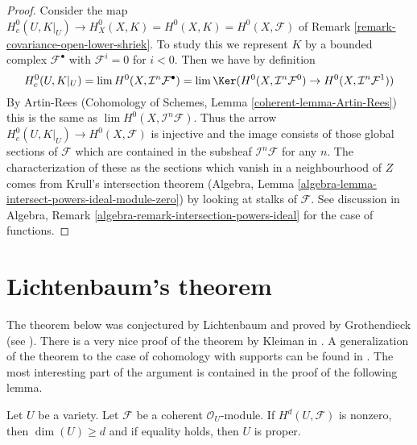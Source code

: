 \begin{proof}
Consider the map
$H^0_c(U, K|_U) \to H^0_X(X, K) = H^0(X, K) = H^0(X, \mathcal{F})$ of
Remark \ref{remark-covariance-open-lower-shriek}. To study this
we represent $K$ by a bounded complex $\mathcal{F}^\bullet$ with
$\mathcal{F}^i = 0$ for $i < 0$. Then we have by definition
$$
H^0_c(U, K|_U) = \lim H^0(X, \mathcal{I}^n\mathcal{F}^\bullet)
= \lim \Ker(
H^0(X, \mathcal{I}^n\mathcal{F}^0) \to
H^0(X, \mathcal{I}^n\mathcal{F}^1))
$$
By Artin-Rees (Cohomology of Schemes, Lemma \ref{coherent-lemma-Artin-Rees})
this is the same as $\lim H^0(X, \mathcal{I}^n\mathcal{F})$.
Thus the arrow $H^0_c(U, K|_U) \to H^0(X, \mathcal{F})$
is injective and the image consists of those global sections of $\mathcal{F}$
which are contained in the subsheaf $\mathcal{I}^n\mathcal{F}$
for any $n$. The characterization of these as the sections which
vanish in a neighbourhood of $Z$ comes from Krull's intersection
theorem (Algebra, Lemma \ref{algebra-lemma-intersect-powers-ideal-module-zero})
by looking at stalks of $\mathcal{F}$. See discussion in
Algebra, Remark \ref{algebra-remark-intersection-powers-ideal}
for the case of functions.
\end{proof}




\section{Lichtenbaum's theorem}
\label{section-lichtenbaum}

\noindent
The theorem below was conjectured by Lichtenbaum and proved by Grothendieck
(see \cite{Hartshorne-local-cohomology}). There is a very nice proof of the
theorem by Kleiman in \cite{Kleiman-Lichtenbaum}. A generalization of
the theorem to the case of cohomology with supports can be found in
\cite{Lyubeznik-Lichtenbaum}. The most interesting part of the argument
is contained in the proof of the following lemma.

\begin{lemma}
\label{lemma-lichtenbaum}
Let $U$ be a variety. Let $\mathcal{F}$ be a coherent $\mathcal{O}_U$-module.
If $H^d(U, \mathcal{F})$ is nonzero, then $\dim(U) \geq d$ and if
equality holds, then $U$ is proper.
\end{lemma}

